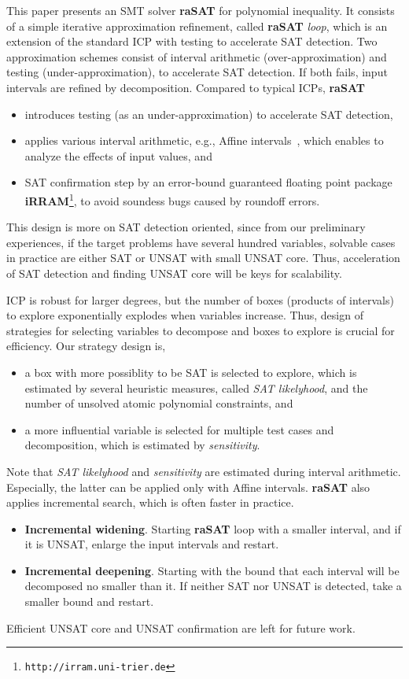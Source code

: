 \documentclass[runningheads,a4paper,oribibl]{llncs}
\begin{document}
This paper presents an SMT solver {\bf raSAT} for polynomial inequality. 
It consists of a simple iterative approximation refinement, called {\bf raSAT} {\em loop}, 
which is an extension of the standard ICP with testing to accelerate SAT detection. 
Two approximation schemes consist of interval arithmetic (over-approximation) and 
testing (under-approximation), to accelerate SAT detection. 
If both fails, input intervals are refined by decomposition. 
%
Compared to typical ICPs, {\bf raSAT} 
\begin{itemize}
\item introduces testing (as an under-approximation) to accelerate SAT detection, 
\item applies various interval arithmetic, e.g., Affine intervals~\cite{Stolfi03,ngocase,tapas12}, 
which enables to analyze the effects of input values, and 
\item SAT confirmation step by an error-bound guaranteed floating point package {\bf iRRAM}\footnote{%
\tt http://irram.uni-trier.de}, to avoid soundess bugs caused by roundoff errors. 
\end{itemize}
This design is more on SAT detection oriented, since from our preliminary experiences, 
if the target problems have several hundred variables, solvable cases in practice are 
either SAT or UNSAT with small UNSAT core. 
Thus, acceleration of SAT detection and finding UNSAT core will be keys for scalability. 

ICP is robust for larger degrees, but the number of boxes (products of intervals) to explore 
exponentially explodes when variables increase. 
Thus, design of strategies for selecting variables to decompose and boxes to explore is crucial 
for efficiency. Our strategy design is, 
\begin{itemize}
\item a box with more possiblity to be SAT is selected to explore, which is estimated by 
several heuristic measures, called {\em SAT likelyhood}, 
and the number of unsolved atomic polynomial constraints, and
\item a more influential variable is selected for multiple test cases and decomposition, 
which is estimated by {\em sensitivity}. 
\end{itemize} 
Note that {\em SAT likelyhood} and {\em sensitivity} are estimated during interval arithmetic. 
Especially, the latter can be applied only with Affine intervals. 
{\bf raSAT} also applies incremental search, which is often faster in practice. 
\begin{itemize}
\item {\bf Incremental widening}. 
Starting {\bf raSAT} loop with a smaller interval, and if it is UNSAT, enlarge the input intervals
and restart. 
\item {\bf Incremental deepening}. 
Starting with the bound that each interval will be decomposed no smaller than it. 
If neither SAT nor UNSAT is detected, take a smaller bound and restart. 
\end{itemize} 
Efficient UNSAT core and UNSAT confirmation %
are left for future work. 
\end{document}
